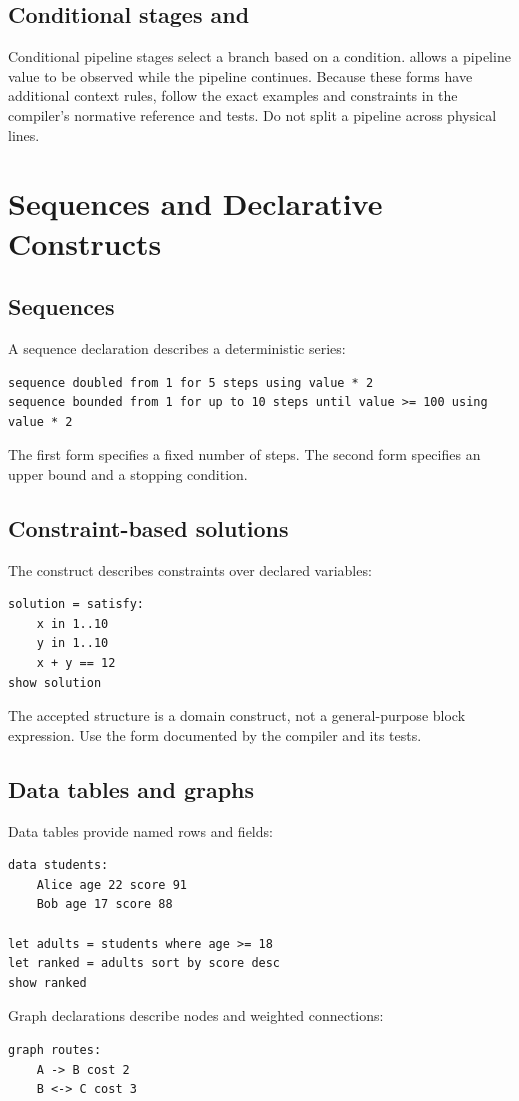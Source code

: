 \documentclass[11pt,a4paper,oneside]{book}
\newcommand{\code}[1]{\texttt{\detokenize{#1}}}
\begin{document}
\section{Conditional stages and \code{tee}}
Conditional pipeline stages select a branch based on a condition. \code{tee} allows a pipeline value to be observed while the pipeline continues. Because these forms have additional context rules, follow the exact examples and constraints in the compiler's normative reference and tests. Do not split a pipeline across physical lines.

\chapter{Sequences and Declarative Constructs}
\section{Sequences}
A sequence declaration describes a deterministic series:
\begin{lstlisting}
sequence doubled from 1 for 5 steps using value * 2
sequence bounded from 1 for up to 10 steps until value >= 100 using value * 2
\end{lstlisting}
The first form specifies a fixed number of steps. The second form specifies an upper bound and a stopping condition.

\section{Constraint-based solutions}
The \code{satisfy} construct describes constraints over declared variables:
\begin{lstlisting}
solution = satisfy:
    x in 1..10
    y in 1..10
    x + y == 12
show solution
\end{lstlisting}
The accepted structure is a domain construct, not a general-purpose block expression. Use the form documented by the compiler and its tests.

\section{Data tables and graphs}
Data tables provide named rows and fields:
\begin{lstlisting}
data students:
    Alice age 22 score 91
    Bob age 17 score 88

let adults = students where age >= 18
let ranked = adults sort by score desc
show ranked
\end{lstlisting}
Graph declarations describe nodes and weighted connections:
\begin{lstlisting}
graph routes:
    A -> B cost 2
    B <-> C cost 3
\end{lstlisting}
\end{document}

